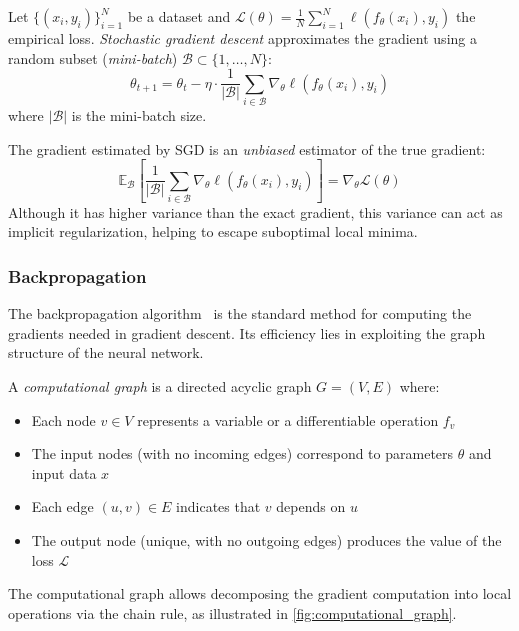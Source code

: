 \begin{definition}\label{def:sgd}
	Let \(\{(x_i, y_i)\}_{i=1}^N\) be a dataset and \(\mathcal{L}(\theta) = \frac{1}{N}\sum_{i=1}^N \ell(f_\theta(x_i), y_i)\) the empirical loss. \textit{Stochastic gradient descent} approximates the gradient using a random subset (\textit{mini-batch}) \(\mathcal{B} \subset \{1,\ldots,N\}\):
\[
	\theta_{t+1} = \theta_t - \eta \cdot \frac{1}{|\mathcal{B}|}\sum_{i \in \mathcal{B}} \nabla_\theta \ell(f_\theta(x_i), y_i)
\]
where \(|\mathcal{B}|\) is the mini-batch size.
\end{definition}

The gradient estimated by \gls{SGD} is an \textit{unbiased} estimator of the true gradient:
\[
	\mathbb{E}_{\mathcal{B}}\left[\frac{1}{|\mathcal{B}|}\sum_{i \in \mathcal{B}} \nabla_\theta \ell(f_\theta(x_i), y_i)\right] = \nabla_\theta \mathcal{L}(\theta)
\]
Although it has higher variance than the exact gradient, this variance can act as implicit regularization, helping to escape suboptimal local minima.

\subsubsection{Backpropagation}\label{subsubsec:backpropagation}

The backpropagation algorithm~\citep{backpropagation} is the standard method for computing the gradients needed in gradient descent. Its efficiency lies in exploiting the graph structure of the neural network.

\begin{definition}\label{def:computational_graph}
	A \textit{computational graph} is a directed acyclic graph \(G = (V, E)\) where:
	\begin{itemize}
		\item Each node \(v \in V\) represents a variable or a differentiable operation \(f_v\)
		\item The input nodes (with no incoming edges) correspond to parameters \(\theta\) and input data \(x\)
		\item Each edge \((u, v) \in E\) indicates that \(v\) depends on \(u\)
		\item The output node (unique, with no outgoing edges) produces the value of the loss \(\mathcal{L}\)
	\end{itemize}
\end{definition}

The computational graph allows decomposing the gradient computation into local operations via the chain rule, as illustrated in \autoref{fig:computational_graph}.

